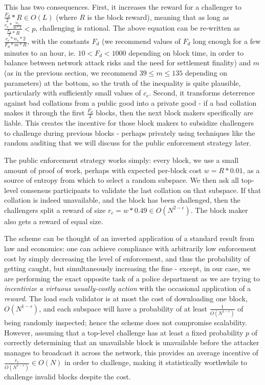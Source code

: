 \documentclass[11pt,a4paper]{article}
\theoremstyle{plain}
\theoremstyle{definition}
\theoremstyle{remark}
\begin{document}
This has two consequences. First, it increases the reward for a challenger to $\frac{F_d}{2} * R \in O(L)$ (where $R$ is the block reward), meaning that as long as $\frac{c_c * \frac{n_v}{m * 2}}{\frac{F_d}{2} * R} < p$, challenging is rational. The above equation can be re-written as $\frac{c_c * n_v * 2}{F_d * m * R}$, with the constants $F_d$ (we recommend values of $F_d$ long enough for a few minutes to an hour, ie. $10 < F_d < 1000$ depending on block time, in order to balance between network attack risks and the need for settlement finality) and $m$ (as in the previous section, we recommend $39 \le m \le 135$ depending on parameters) at the bottom, so the truth of the inequality is quite plausible, particularly with sufficiently small values of $c_c$. Second, it transforms deterrence against bad collations from a public good into a private good - if a bad collation makes it through the first $\frac{F_d}{2}$ blocks, then the next block makers specifically are liable. This creates the incentive for those block makers to subsidize challengers to challenge during previous blocks - perhaps privately using techniques like the random auditing that we will discuss for the public enforcement strategy later.

The public enforcement strategy works simply: every block, we use a small amount of proof of work, perhaps with expected per-block cost $w = R * 0.01$, as a source of entropy from which to select a random subspace. We then ask all top-level consensus participants to validate the last collation on that subspace. If that collation is indeed unavailable, and the block has been challenged, then the challengers split a reward of size $r_c = w * 0.49 \in O(N^{2-\epsilon})$. The block maker also gets a reward of equal size.

The scheme can be thought of an inverted application of a standard result from law and economics: one can achieve compliance with arbitrarily low enforcement cost by simply decreasing the level of enforcement, and thus the probability of getting caught, but simultaneously increasing the fine\cite{econofcrime} - except, in our case, we are performing the exact opposite task of a police department as we are trying to \emph{incentivize a virtuous usually-costly action} with the occasional application of a \emph{reward}. The load each validator is at most the cost of downloading one block, $O(N^{1-\epsilon})$, and each subspace will have a probability of at least $\frac{1}{O(N^{1-\epsilon})}$ of being randomly inspected; hence the scheme does not compromise scalability. However, assuming that a top-level challenge has at least a fixed probability $p$ of correctly determining that an unavailable block is unavailable before the attacker manages to broadcast it across the network, this provides an average incentive of $\frac{r_c}{O(N^{1-\epsilon})} \in O(N)$ in order to challenge, making it statistically worthwhile to challenge invalid blocks despite the cost.
\end{document}
